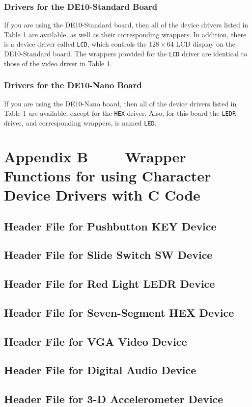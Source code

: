 \documentclass[11pt, twoside, pdftex]{article}
\newcommand{\commonPath}{../../Common}
\begin{document}
\subsubsection*{Drivers for the DE10-Standard Board}

If you are using the DE10-Standard board, then all of the device drivers listed in Table 1
are available, as well as their corresponding wrappers. In addition, there is a device
driver called \texttt{LCD}, which controls the $128 \times 64$ LCD display on the
DE10-Standard board. The wrappers provided for the \texttt{LCD} driver are identical to
those of the video driver in Table 1.

\subsubsection*{Drivers for the DE10-Nano Board}

If you are using the DE10-Nano board, then all of the device drivers listed in Table 1 are
available, except for the \texttt{HEX} driver. Also, for this board the \texttt{LEDR}
driver, and corresponding wrappers, is named \texttt{LED}.

\newpage
\section*{Appendix B~~~~ Wrapper Functions for using Character Device Drivers with C Code}

\subsection*{Header File for Pushbutton KEY Device}
\lstset{language=C,numbers=none}

\newpage
\subsection*{Header File for Slide Switch SW Device}

\newpage
\subsection*{Header File for Red Light LEDR Device}

\newpage
\subsection*{Header File for Seven-Segment HEX Device}

\newpage
\subsection*{Header File for VGA Video Device}

\newpage
\subsection*{Header File for Digital Audio Device}

\newpage
\subsection*{Header File for 3-D Accelerometer Device}





\end{document}
